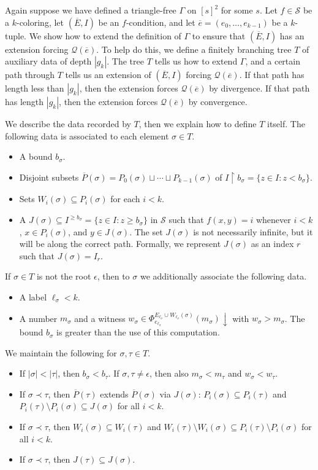 \documentclass{article}
\def\Q{\mathcal{Q}}
\def\Sc{\mathcal{S}}
\def\Q{\mathcal{Q}}
\newcommand{\uh}{\upharpoonright}
\newcommand{\converge}{\!\!\downarrow}
\newcommand{\ol}[1]{\overline{#1}}
\numberwithin{theorem}{section}
\begin{document}
Again suppose we have defined a triangle-free $\Gamma$ on $[s]^2$ for some $s$.  Let $f \in \Sc$ be a $k$-coloring, let $(\ol{E}, I)$ be an $f$-condition, and let $\ol{e} = (e_0, \dots, e_{k-1})$ be a $k$-tuple.  We show how to extend the definition of $\Gamma$ to ensure that $(\ol{E}, I)$ has an extension forcing $\Q(\ol{e})$.  To help do this, we define a finitely branching tree $T$ of auxiliary data of depth $|g_k|$.  The tree $T$ tells us how to extend $\Gamma$, and a certain path through $T$ tells us an extension of $(\ol{E}, I)$ forcing $\Q(\ol{e})$.  If that path has length less than $|g_k|$, then the extension forces $\Q(\ol{e})$ by divergence.  If that path has length $|g_k|$, then the extension forces $\Q(\ol{e})$ by convergence.

We describe the data recorded by $T$, then we explain how to define $T$ itself.  The following data is associated to each element $\sigma \in T$.
\begin{itemize}
\item A bound $b_\sigma$.
\item Disjoint subsets $\ol{P}(\sigma) = P_0(\sigma) \sqcup \cdots \sqcup P_{k-1}(\sigma)$ of $I \uh b_\sigma = \{z \in I : z < b_\sigma\}$.
\item Sets $W_i(\sigma) \subseteq P_i(\sigma)$ for each $i < k$.
\item A $J(\sigma) \subseteq I^{\geq b_\sigma} = \{z \in I : z \geq b_\sigma\}$ in $\Sc$ such that $f(x,y) = i$ whenever $i < k$, $x \in P_i(\sigma)$, and $y \in J(\sigma)$.  The set $J(\sigma)$ is not necessarily infinite, but it will be along the correct path.  Formally, we represent $J(\sigma)$ as an index $r$ such that $J(\sigma) = I_r$.
\end{itemize}
If $\sigma \in T$ is not the root $\epsilon$, then to $\sigma$ we additionally associate the following data.
\begin{itemize}
\item A label $\ell_\sigma < k$.
\item A number $m_\sigma$ and a witness $w_\sigma \in \Phi_{e_{\ell_\sigma}}^{E_{\ell_\sigma} \cup W_{\ell_\sigma}(\sigma)}(m_\sigma)\converge$ with $w_\sigma > m_\sigma$.  The bound $b_\sigma$ is greater than the use of this computation.
\end{itemize}

We maintain the following for $\sigma, \tau \in T$.
\begin{itemize}
\item If $|\sigma| < |\tau|$, then $b_\sigma < b_\tau$.  If $\sigma, \tau \neq \epsilon$, then also $m_\sigma < m_\tau$ and $w_\sigma < w_\tau$.
\item If $\sigma \prec \tau$, then $\ol{P}(\tau)$ extends $\ol{P}(\sigma)$ via $J(\sigma)$:  $P_i(\sigma) \subseteq P_i(\tau)$ and $P_i(\tau) \setminus P_i(\sigma) \subseteq J(\sigma)$ for all $i < k$.
\item If $\sigma \prec \tau$, then $W_i(\sigma) \subseteq W_i(\tau)$ and $W_i(\tau) \setminus W_i(\sigma) \subseteq P_i(\tau) \setminus P_i(\sigma)$ for all $i < k$.
\item If $\sigma \prec \tau$, then $J(\tau) \subseteq J(\sigma)$.
\end{itemize}
\end{document}
